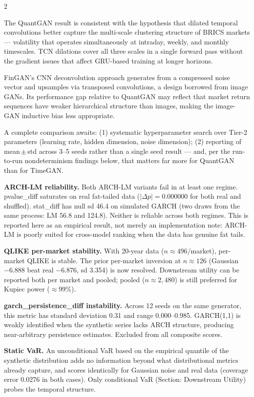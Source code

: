 \documentclass[10pt]{article}
\newcommand{\redbox}[2]{\begin{tcolorbox}[mybox={DRed}{RBg},title={#1}]#2\end{tcolorbox}}
\begin{document}
\begin{multicols}{2}
{The QuantGAN result is consistent with the hypothesis that dilated temporal convolutions better capture the multi-scale clustering structure of BRICS markets --- volatility that operates simultaneously at intraday, weekly, and monthly timescales. TCN dilations cover all three scales in a single forward pass without the gradient issues that affect GRU-based training at longer horizons.

FinGAN's CNN deconvolution approach generates from a compressed noise vector and upsamples via transposed convolutions, a design borrowed from image GANs. Its performance gap relative to QuantGAN may reflect that market return sequences have weaker hierarchical structure than images, making the image-GAN inductive bias less appropriate.

A complete comparison awaits: (1) systematic hyperparameter search over Tier-2 parameters (learning rate, hidden dimension, noise dimension); (2) reporting of mean\,$\pm$\,std across 3--5 seeds rather than a single seed result --- and, per the run-to-run nondeterminism findings below, that matters far more for QuantGAN than for TimeGAN.}

\columnbreak

\redbox{Known Failure Modes and Limitations}{%
\textbf{ARCH-LM reliability.} Both ARCH-LM variants fail in at least one regime. pvalue\_diff saturates on real fat-tailed data ($|\Delta p| = 0.000000$ for both real and shuffled). stat\_diff has null sd 46.4 on simulated GARCH (two draws from the same process: LM 56.8 and 124.8). Neither is reliable across both regimes. This is reported here as an empirical result, not merely an implementation note: ARCH-LM is poorly suited for cross-model ranking when the data has genuine fat tails.

\textbf{QLIKE per-market stability.} With 20-year data ($n\approx496$/market), per-market QLIKE is stable. The prior per-market inversion at $n\approx126$ (Gaussian $-6.888$ beat real $-6.876$, sd 3.354) is now resolved. Downstream utility can be reported both per market and pooled; pooled ($n\approx2{,}480$) is still preferred for Kupiec power ($\approx99\%$).

\textbf{garch\_persistence\_diff instability.} Across 12 seeds on the same generator, this metric has standard deviation 0.31 and range 0.000--0.985. GARCH(1,1) is weakly identified when the synthetic series lacks ARCH structure, producing near-arbitrary persistence estimates. Excluded from all composite scores.

\textbf{Static VaR.} An unconditional VaR based on the empirical quantile of the synthetic distribution adds no information beyond what distributional metrics already capture, and scores identically for Gaussian noise and real data (coverage error 0.0276 in both cases). Only conditional VaR (Section: Downstream Utility) probes the temporal structure.

}
\end{multicols}
\end{document}

